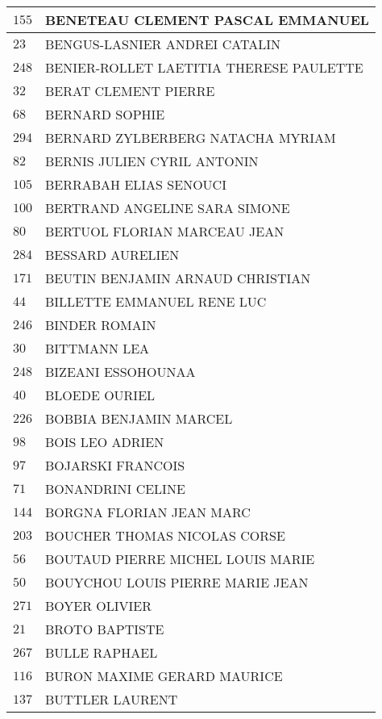 \begin{xltabular}{\linewidth}{|l|X|}
    \hline
    $155$ & BENETEAU CLEMENT PASCAL EMMANUEL \\
    \hline
    $23$ & BENGUS-LASNIER ANDREI CATALIN \\
    \hline
    $248$ & BENIER-ROLLET LAETITIA THERESE PAULETTE \\
    \hline
    $32$ & BERAT CLEMENT PIERRE \\
    \hline
    $68$ & BERNARD SOPHIE \\
    \hline
    $294$ & BERNARD ZYLBERBERG NATACHA MYRIAM \\
    \hline
    $82$ & BERNIS JULIEN CYRIL ANTONIN \\
    \hline
    $105$ & BERRABAH ELIAS SENOUCI \\
    \hline
    $100$ & BERTRAND ANGELINE SARA SIMONE \\
    \hline
    $80$ & BERTUOL FLORIAN MARCEAU JEAN \\
    \hline
    $284$ & BESSARD AURELIEN \\
    \hline
    $171$ & BEUTIN BENJAMIN ARNAUD CHRISTIAN \\
    \hline
    $44$ & BILLETTE EMMANUEL RENE LUC \\
    \hline
    $246$ & BINDER ROMAIN \\
    \hline
    $30$ & BITTMANN LEA \\
    \hline
    $248$ & BIZEANI ESSOHOUNAA \\
    \hline
    $40$ & BLOEDE OURIEL \\
    \hline
    $226$ & BOBBIA BENJAMIN MARCEL \\
    \hline
    $98$ & BOIS LEO ADRIEN \\
    \hline
    $97$ & BOJARSKI FRANCOIS \\
    \hline
    $71$ & BONANDRINI CELINE \\
    \hline
    $144$ & BORGNA FLORIAN JEAN MARC \\
    \hline
    $203$ & BOUCHER THOMAS NICOLAS CORSE \\
    \hline
    $56$ & BOUTAUD PIERRE MICHEL LOUIS MARIE \\
    \hline
    $50$ & BOUYCHOU LOUIS PIERRE MARIE JEAN \\
    \hline
    $271$ & BOYER OLIVIER \\
    \hline
    $21$ & BROTO BAPTISTE \\
    \hline
    $267$ & BULLE RAPHAEL \\
    \hline
    $116$ & BURON MAXIME GERARD MAURICE \\
    \hline
    $137$ & BUTTLER LAURENT \\

\end{xltabular}
